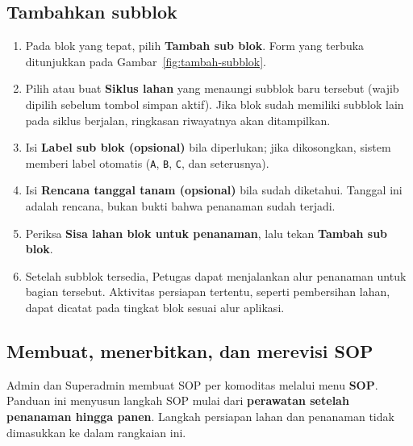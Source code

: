 
\subsection{Tambahkan subblok}

\begin{enumerate}
  \item Pada blok yang tepat, pilih \textbf{Tambah sub blok}. Form yang terbuka ditunjukkan pada Gambar~\ref{fig:tambah-subblok}.
  \item Pilih atau buat \textbf{Siklus lahan} yang menaungi subblok baru tersebut (wajib dipilih sebelum tombol simpan aktif). Jika blok sudah memiliki subblok lain pada siklus berjalan, ringkasan riwayatnya akan ditampilkan.
  \item Isi \textbf{Label sub blok (opsional)} bila diperlukan; jika dikosongkan, sistem memberi label otomatis (\texttt{A}, \texttt{B}, \texttt{C}, dan seterusnya).
  \item Isi \textbf{Rencana tanggal tanam (opsional)} bila sudah diketahui. Tanggal ini adalah rencana, bukan bukti bahwa penanaman sudah terjadi.
  \item Periksa \textbf{Sisa lahan blok untuk penanaman}, lalu tekan \textbf{Tambah sub blok}.
  \item Setelah subblok tersedia, Petugas dapat menjalankan alur penanaman untuk bagian tersebut. Aktivitas persiapan tertentu, seperti pembersihan lahan, dapat dicatat pada tingkat blok sesuai alur aplikasi.
\end{enumerate}


\subsection{Membuat, menerbitkan, dan merevisi SOP}
\label{subsec:kelola-sop}

Admin dan Superadmin membuat SOP per komoditas melalui menu \textbf{SOP}. Panduan ini menyusun langkah SOP mulai dari \textbf{perawatan setelah penanaman hingga panen}. Langkah persiapan lahan dan penanaman tidak dimasukkan ke dalam rangkaian ini.

